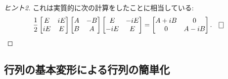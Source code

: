 \documentclass[12pt,twoside]{jarticle}
\begin{document}
\begin{proof}[ヒント2]
{  }これは実質的に次の計算をしたことに相当している:
  \begin{equation*}
    \frac{1}{2}
    \begin{bmatrix}
       E & iE \\
      iE &  E \\
    \end{bmatrix}
    \begin{bmatrix}
      A & -B \\
      B &  A \\
    \end{bmatrix}
    \begin{bmatrix}
        E & -iE \\
      -iE &   E \\
    \end{bmatrix}
    =
    \begin{bmatrix}
      A+iB &  0  \\
       0   & A-iB \\
    \end{bmatrix}.
    \qed
  \end{equation*}
\end{proof}


\subsection{行列の基本変形による行列の簡単化}
\label{sec:simplify}

\end{document}

